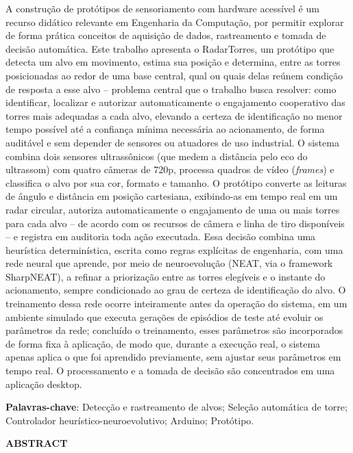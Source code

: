 \documentclass[12pt,a4paper]{article}
\begin{document}
\noindent A construção de protótipos de sensoriamento com hardware acessível é um recurso
didático relevante em Engenharia da Computação, por permitir explorar de forma prática conceitos
de aquisição de dados, rastreamento e tomada de decisão automática. Este trabalho apresenta o
RadarTorres, um protótipo que detecta um alvo em movimento, estima sua posição e determina, entre
as torres posicionadas ao redor de uma base central, qual ou quais delas reúnem condição de
resposta a esse alvo -- problema central que o trabalho busca resolver: como identificar, localizar
e autorizar automaticamente o engajamento cooperativo das torres mais adequadas a cada alvo,
elevando a certeza de identificação no menor tempo possível até a confiança mínima necessária ao
acionamento, de forma auditável e sem depender de sensores ou atuadores de uso industrial. O
sistema combina dois sensores ultrassônicos (que medem a distância pelo eco do ultrassom) com
quatro câmeras de 720p, processa quadros de vídeo (\textit{frames}) e classifica o alvo por sua
cor, formato e tamanho. O protótipo converte as leituras de ângulo e distância em posição
cartesiana, exibindo-as em tempo real em um radar circular, autoriza automaticamente o engajamento
de uma ou mais torres para cada alvo -- de acordo com os recursos de câmera e linha de tiro
disponíveis -- e registra em auditoria toda ação executada. Essa decisão combina uma heurística
determinística, escrita como regras explícitas de engenharia, com uma rede neural que aprende, por
meio de neuroevolução (NEAT, via o framework SharpNEAT), a refinar a priorização entre as torres
elegíveis e o instante do acionamento, sempre condicionado ao grau de certeza de identificação do
alvo. O treinamento dessa rede ocorre
inteiramente antes da operação do sistema, em um ambiente simulado que executa gerações de
episódios de teste até evoluir os parâmetros da rede; concluído o treinamento, esses parâmetros
são incorporados de forma fixa à aplicação, de modo que, durante a execução real, o sistema apenas
aplica o que foi aprendido previamente, sem ajustar seus parâmetros em tempo real. O processamento
e a tomada de decisão são concentrados em uma aplicação desktop.

\noindent\textbf{Palavras-chave}: Detecção e rastreamento de alvos; Seleção automática de torre; Controlador heurístico-neuroevolutivo; Arduino; Protótipo.

\begin{center}
    \textbf{ABSTRACT}
\end{center}
\end{document}
